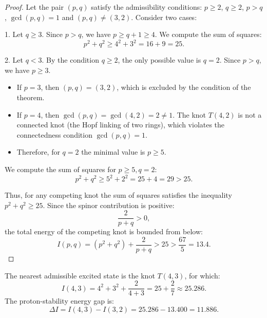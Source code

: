 \documentclass[11pt,a4paper]{article}
\theoremstyle{definition}
\theoremstyle{remark}
\begin{document}
\begin{proof}
Let the pair $(p, q)$ satisfy the admissibility conditions: $p \ge 2$, $q \ge 2$, $p > q$, $\gcd(p, q) = 1$ and $(p, q) \ne (3, 2)$. Consider two cases:

1. Let $q \ge 3$. Since $p > q$, we have $p \ge q + 1 \ge 4$. We compute the sum of squares:
\begin{equation}
	p^2 + q^2 \ge 4^2 + 3^2 = 16 + 9 = 25.
\end{equation}
		
2. Let $q < 3$. By the condition $q \ge 2$, the only possible value is $q = 2$.
Since $p > q$, we have $p \ge 3$.
\begin{itemize}
\item If $p = 3$, then $(p, q) = (3, 2)$, which is excluded by the condition of the theorem.
\item If $p = 4$, then $\gcd(p, q) = \gcd(4, 2) = 2 \ne 1$. The knot $T(4,2)$ is not a connected knot (the Hopf linking of two rings), which violates the connectedness condition $\gcd(p, q) = 1$.
\item Therefore, for $q = 2$ the minimal value is $p \ge 5$.
\end{itemize}
We compute the sum of squares for $p \ge 5, q = 2$:
\begin{equation}
	p^2 + q^2 \ge 5^2 + 2^2 = 25 + 4 = 29 > 25.
\end{equation}
		
Thus, for any competing knot the sum of squares satisfies the inequality $p^2 + q^2 \ge 25$.
Since the spinor contribution is positive:
\begin{equation}
	\frac{2}{p + q} > 0,
\end{equation}
	the total energy of the competing knot is bounded from below:
\begin{equation}
	I(p, q) = (p^2 + q^2) + \frac{2}{p + q} > 25 > \frac{67}{5} = 13.4.
\end{equation}
\end{proof}
	
The nearest admissible excited state is the knot $T(4,3)$, for which:
\begin{equation}
I(4, 3) = 4^2 + 3^2 + \frac{2}{4 + 3} = 25 + \frac{2}{7} \approx 25.286.
\label{eq:knot_4_3_energy}
\end{equation}
	The proton-stability energy gap is:
\begin{equation}
\Delta I = I(4, 3) - I(3, 2) = 25.286 - 13.400 = 11.886.
\label{eq:trefoil_stability_gap}
\end{equation}
	
\end{document}
